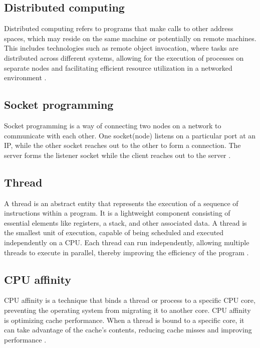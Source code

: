 \documentclass[journal]{./IEEE/IEEEtran}
\begin{document}

\subsection{Distributed computing}
Distributed computing refers to programs that make calls to other address spaces, which may reside on the same machine or potentially on remote machines. This includes technologies such as remote object invocation, where tasks are distributed across different systems, allowing for the execution of processes on separate nodes and facilitating efficient resource utilization in a networked environment
\cite{waldo1996note}.

\subsection{Socket programming}
Socket programming is a way of connecting two nodes on a network to communicate with each other. One socket(node) listens on a particular port at an IP, while the other socket reaches out to the other to form a connection. The server forms the listener socket while the client reaches out to the server \cite{socketc}.

\subsection{Thread}
A thread is an abstract entity that represents the execution of a sequence of instructions within a program.
It is a lightweight component consisting of essential elements like registers, a stack, and other associated data.
A thread is the smallest unit of execution, capable of being scheduled and executed independently on a CPU.
Each thread can run independently, allowing multiple threads to execute in parallel, thereby improving the efficiency of the program \cite{lewis1996pthreads}.

\subsection{CPU affinity}
CPU affinity is a technique that binds a thread or process to a specific CPU core, preventing the operating system from migrating it to another core.
CPU affinity is optimizing cache performance.
When a thread is bound to a specific core, it can take advantage of the cache's contents, reducing cache misses and improving performance \cite{love2003kernel}.
\end{document}
